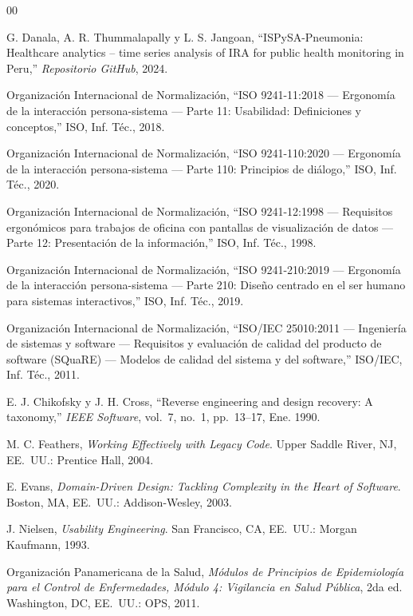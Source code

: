 \documentclass[conference]{IEEEtran}
\begin{document}
\begin{thebibliography}{00}

G. Danala, A. R. Thummalapally y L. S. Jangoan,
``ISPySA-Pneumonia: Healthcare analytics -- time series analysis of IRA for public health monitoring in Peru,''
\textit{Repositorio GitHub}, 2024.

Organizaci\'on Internacional de Normalizaci\'on,
``ISO 9241-11:2018 --- Ergonom\'ia de la interacci\'on persona-sistema --- Parte 11: Usabilidad: Definiciones y conceptos,''
ISO, Inf. T\'ec., 2018.

Organizaci\'on Internacional de Normalizaci\'on,
``ISO 9241-110:2020 --- Ergonom\'ia de la interacci\'on persona-sistema --- Parte 110: Principios de di\'alogo,''
ISO, Inf. T\'ec., 2020.

Organizaci\'on Internacional de Normalizaci\'on,
``ISO 9241-12:1998 --- Requisitos ergon\'omicos para trabajos de oficina con pantallas de visualizaci\'on de datos --- Parte 12: Presentaci\'on de la informaci\'on,''
ISO, Inf. T\'ec., 1998.

Organizaci\'on Internacional de Normalizaci\'on,
``ISO 9241-210:2019 --- Ergonom\'ia de la interacci\'on persona-sistema --- Parte 210: Dise\~no centrado en el ser humano para sistemas interactivos,''
ISO, Inf. T\'ec., 2019.

Organizaci\'on Internacional de Normalizaci\'on,
``ISO/IEC 25010:2011 --- Ingenier\'ia de sistemas y software --- Requisitos y evaluaci\'on de calidad del producto de software (SQuaRE) --- Modelos de calidad del sistema y del software,''
ISO/IEC, Inf. T\'ec., 2011.

E. J. Chikofsky y J. H. Cross,
``Reverse engineering and design recovery: A taxonomy,''
\textit{IEEE Software}, vol.~7, no.~1, pp.~13--17, Ene. 1990.

M. C. Feathers,
\textit{Working Effectively with Legacy Code}.
Upper Saddle River, NJ, EE.~UU.: Prentice Hall, 2004.

E. Evans,
\textit{Domain-Driven Design: Tackling Complexity in the Heart of Software}.
Boston, MA, EE.~UU.: Addison-Wesley, 2003.

J. Nielsen,
\textit{Usability Engineering}.
San Francisco, CA, EE.~UU.: Morgan Kaufmann, 1993.

Organizaci\'on Panamericana de la Salud,
\textit{M\'odulos de Principios de Epidemiolog\'ia para el Control de Enfermedades, M\'odulo 4: Vigilancia en Salud P\'ublica}, 2da ed.
Washington, DC, EE.~UU.: OPS, 2011.


\end{thebibliography}
\end{document}
